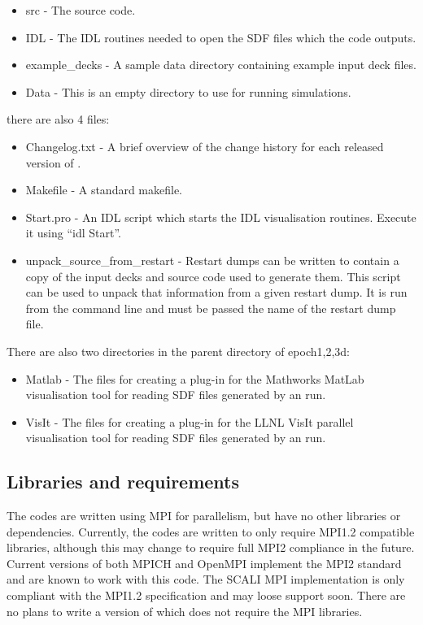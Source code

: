 \begin{itemize}
\item src - The {\EPOCH} source code.
\item IDL - The IDL routines needed to open the SDF files which the code
  outputs.
\item example\_decks - A sample data directory containing example input deck
  files.
\item Data - This is an empty directory to use for running simulations.
\end{itemize}

there are also 4 files:

\begin{itemize}
\item Changelog.txt - A brief overview of the change history for each
  released version of {\EPOCH}.
\item Makefile - A standard makefile.
\item Start.pro - An IDL script which starts the IDL visualisation
  routines. Execute it using ``idl Start''.
\item unpack\_source\_from\_restart - Restart dumps can be written to contain
  a copy of the input decks and source code used to generate them. This script
  can be used to unpack that information from a given restart dump. It is run
  from the command line and must be passed the name of the restart dump file.
\end{itemize}

There are also two directories in the parent directory of epoch{1,2,3}d:

\begin{itemize}
\item Matlab - The files for creating a plug-in for the Mathworks MatLab
  visualisation tool for reading SDF files generated by an {\EPOCH} run.
\item VisIt - The files for creating a plug-in for the LLNL VisIt parallel
  visualisation tool for reading SDF files generated by an {\EPOCH} run.
\end{itemize}

\subsection{Libraries and requirements}
The {\EPOCH} codes are written using MPI for parallelism, but have no other
libraries or dependencies. Currently, the codes are written to only require
MPI1.2 compatible libraries, although this may change to require full MPI2
compliance in the future. Current versions of both MPICH and OpenMPI implement
the MPI2 standard and are known to work with this code. The SCALI MPI
implementation is only compliant with the MPI1.2 specification and may loose
support soon.
There are no plans to write a version of {\EPOCH} which does not require
the MPI libraries.

